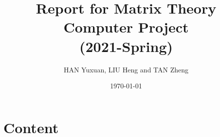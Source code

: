 \documentclass[
    aspectratio=169,                   %
]{beamer}
\begin{document}
    \title{Report for Matrix Theory Computer Project\\(2021-Spring)}  %
    \author{HAN Yuxuan, LIU Heng and TAN Zheng}                  %
    \date{\today}                          %
    \maketitle                             %

\part{Content}








\makebottom     %
\end{document}

